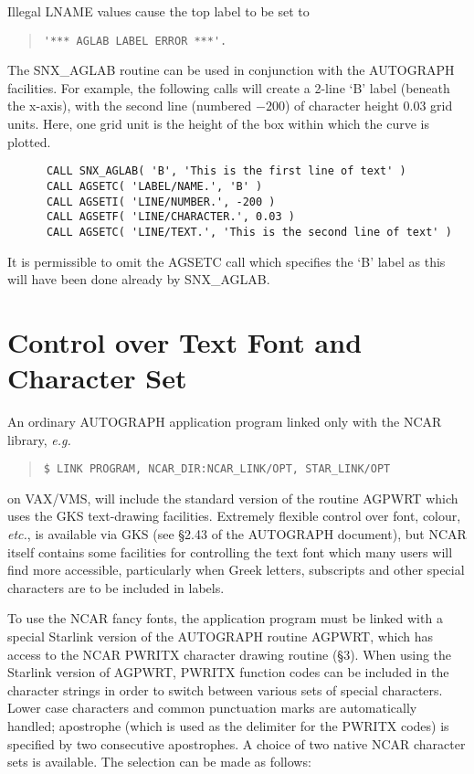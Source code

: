 Illegal LNAME values cause the top label to be set to

\begin {quote}
\begin{verbatim}
'*** AGLAB LABEL ERROR ***'.
\end{verbatim}
\end {quote}

The SNX\_AGLAB routine can be used in conjunction with the AUTOGRAPH facilities.
For example, the following calls will create a 2-line `B' label (beneath the
x-axis), with the second line (numbered $-200$) of character height 0.03 grid
units.
Here, one grid unit is the height of the box within which the curve is
plotted.

\begin{verbatim}
      CALL SNX_AGLAB( 'B', 'This is the first line of text' )
      CALL AGSETC( 'LABEL/NAME.', 'B' )
      CALL AGSETI( 'LINE/NUMBER.', -200 )
      CALL AGSETF( 'LINE/CHARACTER.', 0.03 )
      CALL AGSETC( 'LINE/TEXT.', 'This is the second line of text' )
\end{verbatim}

It is permissible to omit the AGSETC call which specifies the `B' label as
this will have been done already by SNX\_AGLAB.


\section {Control over Text Font and Character Set} \label{text_sect}

An ordinary AUTOGRAPH application program linked only with the NCAR library,
{\em e.g.}

\begin {quote}
\begin{verbatim}
$ LINK PROGRAM, NCAR_DIR:NCAR_LINK/OPT, STAR_LINK/OPT
\end{verbatim}
\end {quote}

on VAX/VMS,
will include the standard version of the routine AGPWRT which uses the GKS
text-drawing facilities.
Extremely flexible control over font, colour, {\em etc.}, is available via GKS
(see \S 2.43 of the AUTOGRAPH document), but NCAR itself contains
some facilities for controlling the text font which many users will find more
accessible, particularly when Greek letters, subscripts and other special
characters are to be included in labels.

To use the NCAR fancy fonts, the application program must be linked with a
special Starlink version of the AUTOGRAPH routine AGPWRT, which has access to
the NCAR PWRITX character drawing routine (\S 3).
When using the Starlink version of AGPWRT, PWRITX function codes can be
included in the character strings in order to switch between various sets of
special characters.
Lower case characters and common punctuation marks are automatically handled;
apostrophe (which is used as the delimiter for the PWRITX codes) is specified
by two consecutive apostrophes.
A choice of two native NCAR character sets is available.
The selection can be made as follows:

